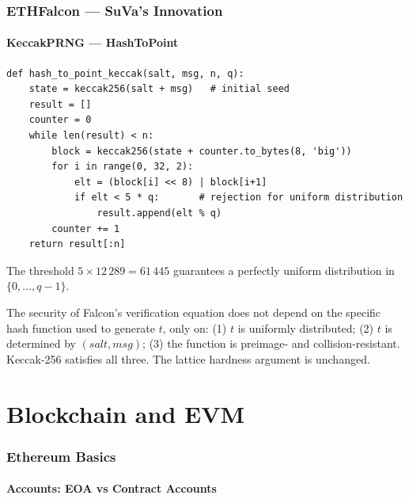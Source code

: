 \documentclass[11pt,a4paper]{article}
\begin{document}
\section{ETHFalcon --- SuVa's Innovation}

\subsection{KeccakPRNG --- HashToPoint}

\begin{lstlisting}[style=python, caption={KeccakPRNG for HashToPoint}]
def hash_to_point_keccak(salt, msg, n, q):
    state = keccak256(salt + msg)   # initial seed
    result = []
    counter = 0
    while len(result) < n:
        block = keccak256(state + counter.to_bytes(8, 'big'))
        for i in range(0, 32, 2):
            elt = (block[i] << 8) | block[i+1]
            if elt < 5 * q:       # rejection for uniform distribution
                result.append(elt % q)
        counter += 1
    return result[:n]
\end{lstlisting}

The threshold $5 \times 12\,289 = 61\,445$ guarantees a perfectly uniform distribution in $\{0,\ldots,q-1\}$.

\begin{resultbox}
The security of Falcon's verification equation does not depend on the specific hash function used to generate $t$, only on: (1) $t$ is uniformly distributed; (2) $t$ is determined by $(salt, msg)$; (3) the function is preimage- and collision-resistant. Keccak-256 satisfies all three. The lattice hardness argument is unchanged.
\end{resultbox}

\newpage
\part{Blockchain and EVM}

\section{Ethereum Basics}

\subsection{Accounts: EOA vs Contract Accounts}
\end{document}
